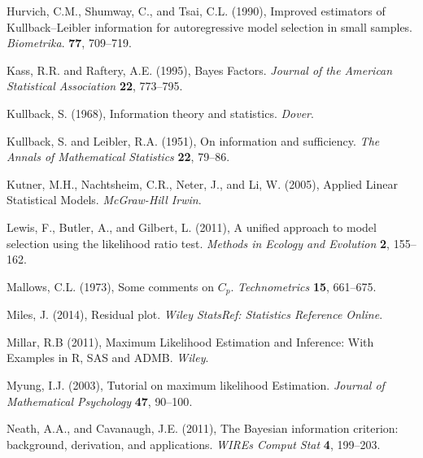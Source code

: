 \phantom{a}

\rff Hurvich, C.M., Shumway, C., and Tsai, C.L. (1990),
      Improved estimators of Kullback–Leibler information for autoregressive model selection in small samples.
      {\it Biometrika}.
      {\bf 77}, {709--719}.

\phantom{a}

\rff Kass, R.R. and Raftery, A.E. (1995),
     Bayes Factors.
     {\it Journal of the American Statistical Association}
     {\bf 22}, {773--795}.

\phantom{a}

\rff Kullback, S. (1968),
      Information theory and statistics.
      {\it Dover}.

\phantom{a}

\rff Kullback, S. and Leibler, R.A. (1951),
     On information and sufficiency.
     {\it The Annals of Mathematical Statistics}
     {\bf 22}, {79--86}.

\phantom{a}

\rff Kutner, M.H., Nachtsheim, C.R., Neter, J., and Li, W. (2005),
      Applied Linear Statistical Models.
      {\it McGraw-Hill Irwin}.

\phantom{a}

\rff Lewis, F., Butler, A., and Gilbert, L. (2011),
      A unified approach to model selection using the likelihood ratio test.
      {\it Methods in Ecology and Evolution}
      {\bf 2}, {155--162}.

\phantom{a}

\rff Mallows, C.L. (1973),
      Some comments on $C_p$.
      {\it Technometrics}
      {\bf 15}, {661--675}.

\phantom{a}

\rff Miles, J. (2014),
      Residual plot.
      {\it Wiley StatsRef: Statistics Reference Online}.      

\phantom{a}

\rff Millar, R.B (2011),
      Maximum Likelihood Estimation and Inference: With Examples in R, SAS and ADMB.
      {\it Wiley}.      

\phantom{a}

\rff Myung, I.J. (2003),
      Tutorial on maximum likelihood Estimation.
      {\it Journal of Mathematical Psychology}
      {\bf 47}, {90--100}.      

\phantom{a}

\rff Neath, A.A., and Cavanaugh, J.E. (2011),
      The Bayesian information criterion: background, derivation, and applications.
      {\it WIREs Comput Stat}
      {\bf 4}, {199--203}.

